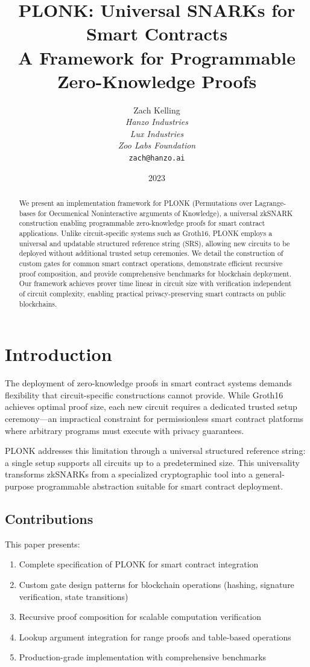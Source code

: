 \documentclass[11pt,a4paper]{article}
\title{PLONK: Universal SNARKs for Smart Contracts\\
A Framework for Programmable Zero-Knowledge Proofs}
\author{Zach Kelling\\
\textit{Hanzo Industries}\\
\textit{Lux Industries}\\
\textit{Zoo Labs Foundation}\\
\texttt{zach@hanzo.ai}}
\date{2023}
\begin{document}
\maketitle

\begin{abstract}
We present an implementation framework for PLONK (Permutations over Lagrange-bases for Oecumenical Noninteractive arguments of Knowledge), a universal zkSNARK construction enabling programmable zero-knowledge proofs for smart contract applications. Unlike circuit-specific systems such as Groth16, PLONK employs a universal and updatable structured reference string (SRS), allowing new circuits to be deployed without additional trusted setup ceremonies. We detail the construction of custom gates for common smart contract operations, demonstrate efficient recursive proof composition, and provide comprehensive benchmarks for blockchain deployment. Our framework achieves prover time linear in circuit size with verification independent of circuit complexity, enabling practical privacy-preserving smart contracts on public blockchains.
\end{abstract}

\section{Introduction}

The deployment of zero-knowledge proofs in smart contract systems demands flexibility that circuit-specific constructions cannot provide. While Groth16 achieves optimal proof size, each new circuit requires a dedicated trusted setup ceremony---an impractical constraint for permissionless smart contract platforms where arbitrary programs must execute with privacy guarantees.

PLONK \cite{plonk} addresses this limitation through a universal structured reference string: a single setup supports all circuits up to a predetermined size. This universality transforms zkSNARKs from a specialized cryptographic tool into a general-purpose programmable abstraction suitable for smart contract deployment.

\subsection{Contributions}

This paper presents:
\begin{enumerate}[label=(\roman*)]
    \item Complete specification of PLONK for smart contract integration
    \item Custom gate design patterns for blockchain operations (hashing, signature verification, state transitions)
    \item Recursive proof composition for scalable computation verification
    \item Lookup argument integration for range proofs and table-based operations
    \item Production-grade implementation with comprehensive benchmarks
\end{enumerate}
\end{document}
